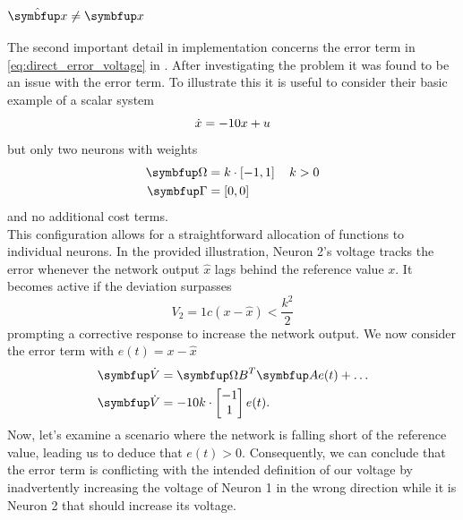 \subsubsection{$\hat{\bmu{x}} \neq \bmu{x}$}
The second important detail in implementation concerns the error term in \cref{eq:direct_error_voltage} in \cite{huang_spiking_2019}. After investigating the problem it was found to be an issue with the error term. To illustrate this it is useful to consider their basic example of a scalar system
\begin{equation}
\dot{x} = -10x + u\\
\end{equation}
but only two neurons with weights
\begin{equation}
\begin{aligned}
\bmu{\Omega} &= k\cdot\left[-1 , 1\right] \quad k>0\\
\bmu{\Gamma} &= \left[0,0\right]
\end{aligned}
\end{equation}
and no additional cost terms.\\
This configuration allows for a straightforward allocation of functions to individual neurons. In the provided illustration, Neuron 2's voltage tracks the error whenever the network output $\hat{x}$ lags behind the reference value $x$. It becomes active if the deviation surpasses
\begin{equation}
V_2 = 1c\left(x-\hat{x} \right) < \frac{k^2}{2}
\end{equation}
prompting a corrective response to increase the network output.
We now consider the error term with $e(t) = x-\hat{x}$
\begin{equation}
\begin{aligned}
\bmu{\dot{V}}&= \bmu{\Omega B}^T \bmu{A}e(t) + \dots\\
\bmu{\dot{V}}&=  -10k \cdot\begin{bmatrix}-1\\1\end{bmatrix}e(t).
\end{aligned}
\end{equation}
Now, let's examine a scenario where the network is falling short of the reference value, leading us to deduce that $e(t)>0$. Consequently, we can conclude that the error term is conflicting with the intended definition of our voltage by inadvertently increasing the voltage of Neuron 1 in the wrong direction while it is Neuron 2 that should increase its voltage.\\
